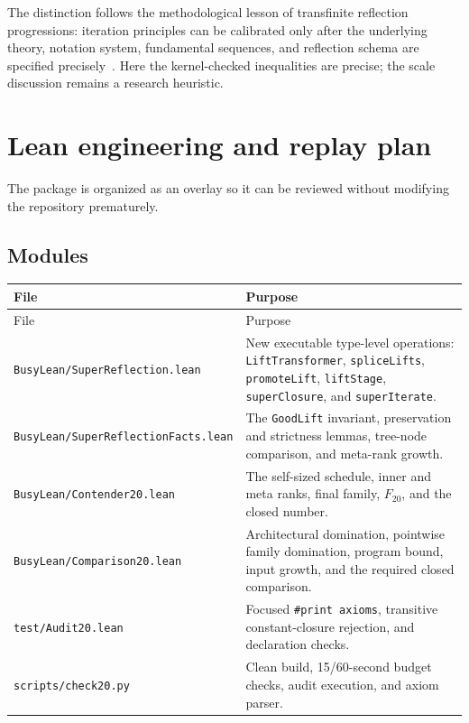 \documentclass[11pt]{article}
\theoremstyle{definition}
\theoremstyle{remark}
\newcommand{\leanname}[1]{\nolinkurl{#1}}
\newcommand{\code}[1]{\texttt{#1}}
\begin{document}
The distinction follows the methodological lesson of transfinite reflection
progressions: iteration principles can be calibrated only after the underlying
theory, notation system, fundamental sequences, and reflection schema are
specified precisely~\cite{Feferman1962,Schuette1977,Buchholz1986}.  Here the
kernel-checked inequalities are precise; the scale discussion remains a
research heuristic.

\section{Lean engineering and replay plan}

The package is organized as an overlay so it can be reviewed without modifying
the repository prematurely.

\subsection{Modules}

\begin{longtable}{>{\raggedright\arraybackslash}p{}
                  >{\raggedright\arraybackslash}p{}}
\toprule
File & Purpose\\
\midrule
\endfirsthead
\toprule
File & Purpose\\
\midrule
\endhead
\leanname{BusyLean/SuperReflection.lean}
  & New executable type-level operations: \leanname{LiftTransformer},
    \leanname{spliceLifts}, \leanname{promoteLift}, \leanname{liftStage},
    \leanname{superClosure}, and \leanname{superIterate}.\\
\leanname{BusyLean/SuperReflectionFacts.lean}
  & The \leanname{GoodLift} invariant, preservation and strictness lemmas,
    tree-node comparison, and meta-rank growth.\\
\leanname{BusyLean/Contender20.lean}
  & The self-sized schedule, inner and meta ranks, final family, $F_{20}$, and
    the closed number.\\
\leanname{BusyLean/Comparison20.lean}
  & Architectural domination, pointwise family domination, program bound,
    input growth, and the required closed comparison.\\
\leanname{test/Audit20.lean}
  & Focused \code{\#print axioms}, transitive constant-closure rejection,
    and declaration checks.\\
\leanname{scripts/check20.py}
  & Clean build, 15/60-second budget checks, audit execution, and axiom parser.\\
\bottomrule
\end{longtable}
\end{document}
